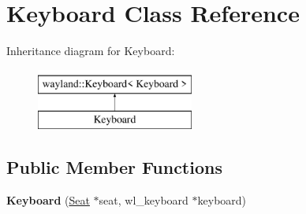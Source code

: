 \hypertarget{classKeyboard}{}\section{Keyboard Class Reference}
\label{classKeyboard}
Inheritance diagram for Keyboard\+:\begin{figure}[H]
\begin{center}
\leavevmode
\includegraphics[height=2.000000cm]{classKeyboard}
\end{center}
\end{figure}
\subsection*{Public Member Functions}
\begin{DoxyCompactItemize}
\item 
\mbox{\label{classKeyboard_a79a2617b5cac010c1da0b7822c47aad2}} 
{\bfseries Keyboard} (\mbox{\hyperlink{classSeat}{Seat}} $\ast$seat, wl\+\_\+keyboard $\ast$keyboard)
\end{DoxyCompactItemize}
